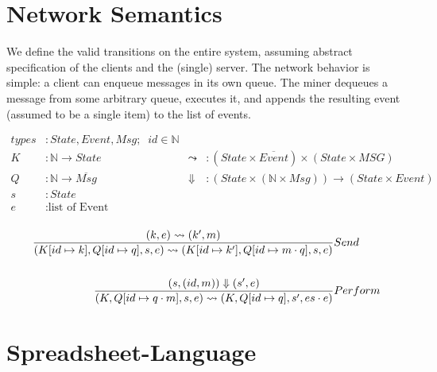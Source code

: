 \documentclass[acmsmall,review,anonymous]{acmart}\settopmatter{printfolios=true}
\begin{document}




\maketitle

\section{Network Semantics}

We define the valid transitions on the entire system, assuming abstract specification of the clients and the (single) server. The network behavior is simple: a client can enqueue messages in its own queue. The miner dequeues a message from some arbitrary queue, executes it, and appends the resulting event (assumed to be a single item) to the list of events.

\begin{align*}
types &: State, Event, Msg; \;\; id \in \mathbb{N} \\
K &: \mathbb{N} \rightarrow State \; & \leadsto &: (State \times \overline{Event}) \times (State \times MSG) \\
Q &: \mathbb{N} \rightarrow \overline{Msg} \; & \Downarrow &: (State \times (\mathbb{N} \times Msg)) \rightarrow (State \times Event) \\
s &: State \\
e &: \text{list of Event} \\
\end{align*}

\begin{align*}
\judge{&Send}{
	(k, e) \leadsto (k', m)
}{
	(K[id \mapsto k], Q[id \mapsto q], s, e) \leadsto (K[id \mapsto k'], Q[id \mapsto m \cdot q], s, e)
}
\\
\\
\judge{&Perform}{
    (s, (id, m)) \Downarrow (s', e)
}{
	(K, Q[id \mapsto q \cdot m], s, e) \leadsto (K, Q[id \mapsto q], s', es \cdot e)
}
\end{align*}

\pagebreak

\setlength{\grammarindent }{2cm}

\section{Spreadsheet-Language}
\end{document}
